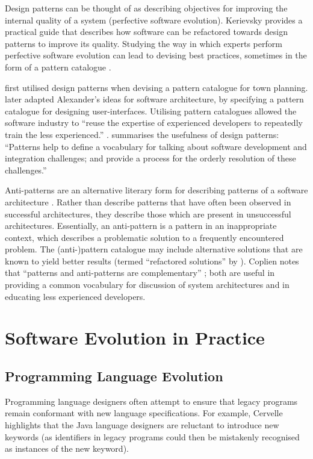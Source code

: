 Design patterns can be thought of as describing objectives for improving the internal quality of a system (perfective software evolution). Kerievsky \cite{kerievsky04refactoring} provides a practical guide that describes how software can be refactored towards design patterns to improve its quality. Studying the way in which experts perform perfective software evolution can lead to devising best practices, sometimes in the form of a pattern catalogue \cite{fowler99refactoring}.

\cite{alexander77pattern} first utilised design patterns when devising a pattern catalogue for town planning. \cite{beck89constructing} later adapted Alexander's ideas for software architecture, by specifying a pattern catalogue for designing user-interfaces. Utilising pattern catalogues allowed the software industry to ``reuse the expertise of experienced developers to repeatedly train the less experienced.'' \cite[pg10]{brown98antipatterns}. \cite[pg xii]{rising01designpatterns} summarises the usefulness of design patterns: ``Patterns help to define a vocabulary for talking about software development and integration challenges; and provide a process for the orderly resolution of these challenges.'' 

Anti-patterns are an alternative literary form for describing patterns of a software architecture \cite{brown98antipatterns}. Rather than describe patterns that have often been observed in successful architectures, they describe those which are present in unsuccessful architectures. Essentially, an anti-pattern is a pattern in an inappropriate context, which describes a problematic solution to a frequently encountered problem. The (anti-)pattern catalogue may include alternative solutions that are known to yield better results (termed ``refactored solutions'' by \cite{brown98antipatterns}). Coplien notes that ``patterns and anti-patterns are complementary'' \cite[pg13]{brown98antipatterns}; both are useful in providing a common vocabulary for discussion of system architectures and in educating less experienced developers.


\section{Software Evolution in Practice}

\subsection{Programming Language Evolution}
Programming language designers often attempt to ensure that legacy programs remain conformant with new language specifications. For example, Cervelle \cite{cervelle06tatoo} highlights that the Java \cite{java} language designers are reluctant to introduce new keywords (as identifiers in legacy programs could then be mistakenly recognised as instances of the new keyword).


